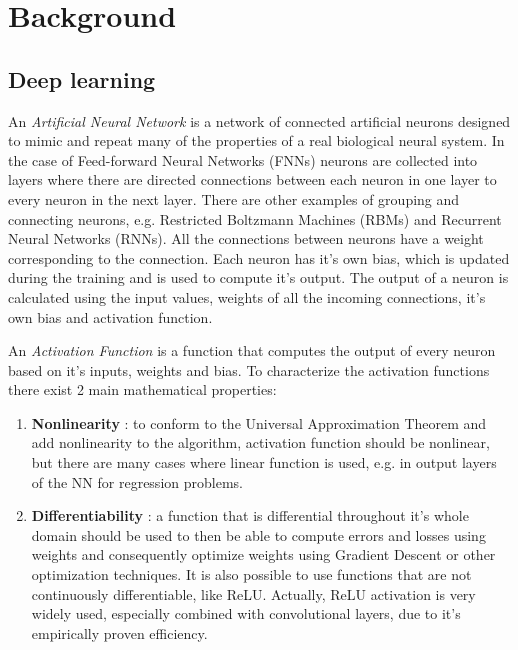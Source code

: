 \chapter{Background}
\label{cha:Background}

\section{Deep learning}

\begin{definition}
  An \textit{Artificial Neural Network} \autocite{oshea2015introductionconvolutionalneuralnetworks} \autocite{sharma2017activation} is a network of connected artificial neurons designed to mimic and repeat many of the properties of a real biological neural system. In the case of Feed-forward Neural Networks (FNNs) neurons are collected into layers where there are directed connections between each neuron in one layer to every neuron in the next layer. There are other examples of grouping and connecting neurons, e.g. Restricted Boltzmann Machines (RBMs) and Recurrent Neural Networks (RNNs). All the connections between neurons have a weight corresponding to the connection. Each neuron has it's own bias, which is updated during the training and is used to compute it's output. The output of a neuron is calculated using the input values, weights of all the incoming connections, it's own bias and activation function.
\end{definition}

\begin{definition}
  An \textit{Activation Function} \autocite{sharma2017activation} is a function that computes the output of every neuron based on it's inputs, weights and bias. To characterize the activation functions there exist 2 main mathematical properties:
  \begin{enumerate}
    \item \textbf{Nonlinearity} \autocite{augustine2024surveyuniversalapproximationtheorems}: to conform to the Universal Approximation Theorem and add nonlinearity to the algorithm, activation function should be nonlinear, but there are many cases where linear function is used, e.g. in output layers of the NN for regression problems.
    \item \textbf{Differentiability} \autocite{sharma2017activation}: a function that is differential throughout it's whole domain should be used to then be able to compute errors and losses using weights and consequently optimize weights using Gradient Descent or other optimization techniques. It is also possible to use functions that are not continuously differentiable, like ReLU. Actually, ReLU activation is very widely used, especially combined with convolutional layers, due to it's empirically proven efficiency.
  \end{enumerate}
\end{definition}

